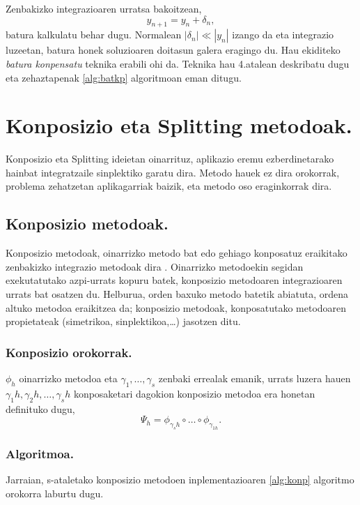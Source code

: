 Zenbakizko integrazioaren urratsa bakoitzean,
\begin{equation*}
y_{n+1}=y_{n}+ \delta_n,
\end{equation*}
batura kalkulatu behar dugu. Normalean $|\delta_n| \ll |y_n| $ izango da eta integrazio luzeetan, batura honek soluzioaren doitasun galera eragingo du. Hau ekiditeko \emph{batura konpensatu} teknika erabili ohi da. Teknika hau 4.atalean deskribatu dugu eta zehaztapenak \ref{alg:batkp} algoritmoan eman ditugu.
 

\section{Konposizio eta Splitting metodoak.}

Konposizio eta Splitting ideietan oinarrituz, aplikazio eremu ezberdinetarako hainbat integratzaile sinplektiko garatu dira. Metodo hauek ez dira orokorrak, problema zehatzetan aplikagarriak baizik, eta metodo oso eraginkorrak dira.

\subsection{Konposizio metodoak.}

Konposizio metodoak, oinarrizko metodo bat edo gehiago konposatuz eraikitako zenbakizko integrazio metodoak dira \cite{Hairer2006}.  Oinarrizko metodoekin segidan exekutatutako azpi-urrats kopuru batek, konposizio metodoaren integrazioaren urrats bat osatzen du. Helburua, orden baxuko metodo batetik abiatuta, ordena altuko metodoa eraikitzea da; konposizio metodoak, konposatutako metodoaren propietateak (simetrikoa, sinplektikoa,\dots) jasotzen ditu. 

\subsubsection*{Konposizio orokorrak.}
$\phi_h$ oinarrizko metodoa eta $\gamma_1,\dots,\gamma_s$ zenbaki errealak emanik, urrats luzera hauen $\gamma_1 h,\gamma_2 h,\dots,\gamma_s h$ konposaketari dagokion konposizio metodoa era honetan definituko dugu,
\begin{equation}
\Psi_h=\phi_{\gamma_s h} \circ \dots \circ \phi_{\gamma_{1 h}}.
\end{equation}

\subsubsection*{Algoritmoa.}
Jarraian, s-ataletako konposizio metodoen inplementazioaren \ref{alg:konp} algoritmo orokorra laburtu dugu.

